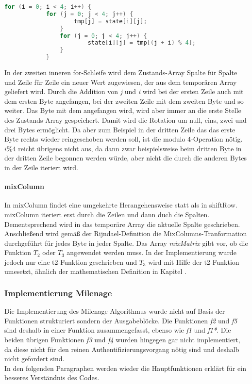 		\begin{lstlisting}[language=C]
		for (i = 0; i < 4; i++) {
			for (j = 0; j < 4; j++) {
		        	tmp[j] = state[i][j];
		        }
	        	for (j = 0; j < 4; j++) {
	            		state[i][j] = tmp[(j + i) % 4];
	        	}
    		}
		\end{lstlisting}

		In der zweiten inneren for-Schleife wird dem Zustands-Array Spalte für Spalte und
		Zeile für Zeile ein neuer Wert zugewiesen, der aus dem temporären Array geliefert
		wird. Durch die Addition von \emph{j} und \emph{i} wird bei der ersten Zeile auch
		mit dem ersten Byte angefangen, bei der zweiten Zeile mit dem zweiten Byte und so
		weiter. Das Byte mit dem angefangen wird, wird aber immer an die erste Stelle des
		Zustands-Array gespeichert. Damit wird die Rotation um null, eins, zwei und drei
		Bytes ermöglicht. Da aber zum Beispiel in der dritten Zeile das
		das erste Byte rechts wieder reingeschoben werden soll, ist die modulo 4-Operation
		nötig. \\
		$i \% 4$ reicht übrigens nicht aus, da dann zwar beispielsweise beim dritten Byte
		in der dritten Zeile begonnen werden würde, aber nicht die durch die
		anderen Bytes in der Zeile iteriert wird. 

		\paragraph{mixColumn}
		In mixColumn findet eine umgekehrte Herangehensweise statt als in shiftRow.
		mixColumn iteriert erst durch die Zeilen und dann duch die Spalten. Dementsprechend
		wird in das temporäre Array die aktuelle Spalte geschrieben. \\
		Anschließend wird gemäß der Rijndael-Definition die MixColumns-Tranformation
		durchgeführt für jedes Byte in jeder Spalte. Das Array \emph{mixMatrix} gibt vor,
		ob die Funktion $T_2$ oder $T_3$ angewendet werden muss. In der Implementierung
		wurde jedoch nur eine t2-Funktion geschrieben und $T_3$ wird mit Hilfe der 
		t2-Funktion umesetzt, ähnlich der mathematischen Definition in Kapitel
		.

	\subsubsection{Implementierung Milenage}
	\label{implementierung-milenage}
	Die Implementierung des Milenage Algorithmus wurde nicht auf Basis der Funktionen
	strukturiert sondern der Ausgabeblöcke. Die Funktionen \emph{f2} und \emph{f5} sind
	deshalb in einer Funktion zusammengefasst, ebenso wie \emph{f1} und \emph{f1*}. Die
	beiden übrigen Funktionen \emph{f3} und \emph{f4} wurden hingegen gar nicht implementiert,
	da diese nicht für den reinen Authentifizierungsvorgang nötig sind und deshalb nicht
	gefordert sind. \\
	In den folgenden Paragraphen werden wieder die Hauptfunktionen erklärt für ein besseres
	Verständnis des Codes.
	
